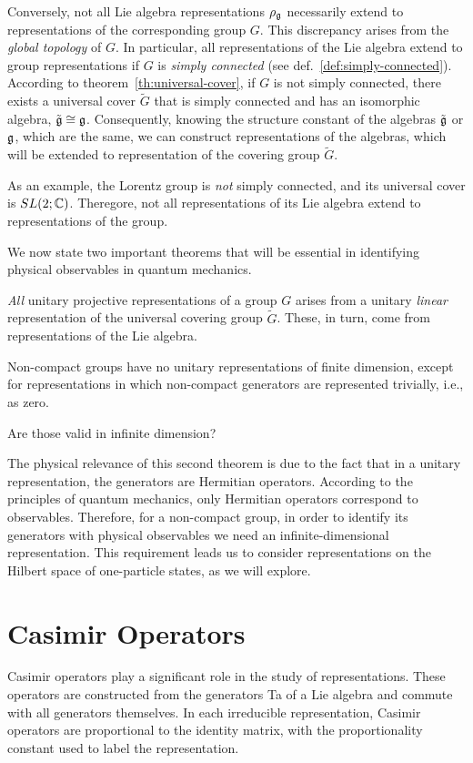 Conversely, not all Lie algebra representations $\rho_{\mathfrak{g}}$ necessarily extend to representations of the corresponding group $G$.  This discrepancy arises from the \emph{global topology} of $G$. In particular, all representations of the Lie algebra extend to group representations if $G$ is \emph{simply connected} (see def.~\ref{def:simply-connected}). According to theorem~\ref{th:universal-cover}, if $G$ is not simply connected, there exists a universal cover $\tilde{G}$ that is simply connected and has an isomorphic algebra, $\tilde{\mathfrak{g}} \cong \mathfrak{g}$. Consequently, knowing the structure constant of the algebras $\tilde{\mathfrak{g}}$ or $\mathfrak{g}$, which are the same, we can construct representations of the algebras, which will be extended to representation of the covering group $\tilde{G}$.

As an example, the Lorentz group is \emph{not} simply connected, and its universal cover is $SL(2;\mathbb{C})$. Theregore, not all representations of its Lie algebra extend to representations of the group.

We now state two important theorems that will be essential in identifying physical observables in quantum mechanics.
\begin{theorem}\label{th:unitary-rep}
    \emph{All} unitary projective representations of a group $G$ arises from a unitary \emph{linear} representation of the universal covering group $\tilde{G}$. These, in turn, come from representations of the Lie algebra.
\end{theorem}


\begin{theorem}\label{th:non-compact-group-rep}
    Non-compact groups have no unitary representations of finite dimension, except for representations in which non-compact generators are represented trivially, i.e., as zero.
\end{theorem}

\color{red} Are those valid in infinite dimension?\color{black}

The physical relevance of this second theorem is due to the fact that in a unitary representation, the generators are Hermitian operators. According to the principles of quantum mechanics, only Hermitian operators correspond to observables. Therefore, for a non-compact group, in order to identify its generators with physical observables we need an infinite-dimensional representation. This requirement leads us to consider representations on the Hilbert space of one-particle states, as we will explore.



\section{Casimir Operators}\label{sec:casimir}
Casimir operators play a significant role in the study of representations. These operators are constructed from the generators Ta of a Lie algebra and commute with all generators themselves. In each irreducible representation, Casimir operators are proportional to the identity matrix, with the proportionality constant used to label the representation.